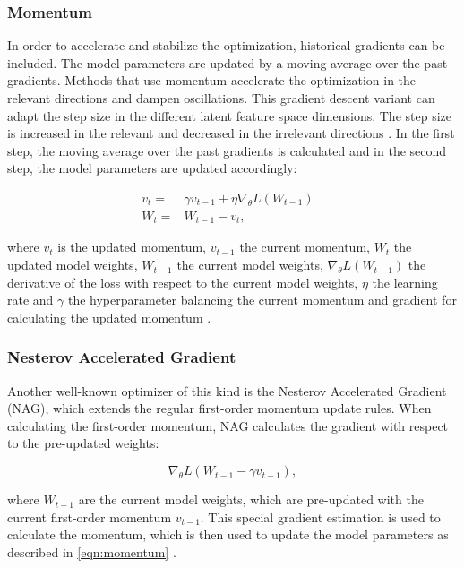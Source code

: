 \subsubsection{Momentum}
In order to accelerate and stabilize the optimization, historical gradients can be included. The model parameters are updated by a moving average over the past gradients. Methods that use momentum accelerate the optimization in the relevant directions and dampen oscillations. This gradient descent variant can adapt the step size in the different latent feature space dimensions. The step size is increased in the relevant and decreased in the irrelevant directions \cite{Ruder2016}. In the first step, the moving average over the past gradients is calculated and in the second step, the model parameters are updated accordingly:

    \begin{equation}
      \begin{aligned}
          v_{t} = & \gamma v_{t-1} +  \eta \nabla_{\theta}L(W_{t-1}) &\\
          W_{t} = &W_{t-1} - v_{t},
          \label{eqn:momentum}
      \end{aligned}
    \end{equation}

where $v_{t}$ is the updated momentum, $v_{t-1}$ the current momentum, $W_{t}$ the updated model weights, $W_{t-1}$ the current model weights, $\nabla_{\theta}L(W_{t-1})$ the derivative of the loss with respect to the current model weights, $\eta$ the learning rate and $\gamma$ the hyperparameter balancing the current momentum and gradient for calculating the updated momentum \cite{Ruder2016}.

    
\subsubsection{Nesterov Accelerated Gradient}
Another well-known optimizer of this kind is the Nesterov Accelerated Gradient (NAG), which extends the regular first-order momentum update rules. When calculating the first-order momentum, NAG calculates the gradient with respect to the pre-updated weights: 

\begin{equation}
    \nabla_{\theta}L( W_{t-1} - \gamma v_{t-1}),
\end{equation}
    
where $W_{t-1}$ are the current model weights, which are pre-updated with the current first-order momentum $v_{t-1}$. This special gradient estimation is used to calculate the momentum, which is then used to update the model parameters as described in \ref{eqn:momentum} \cite{Ruder2016}.

